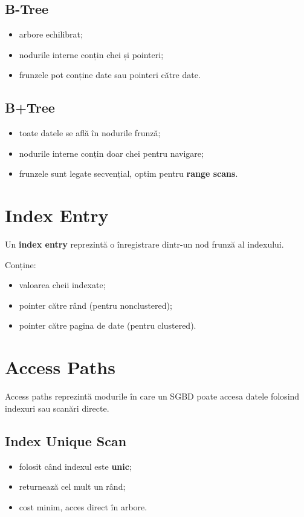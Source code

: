 \documentclass[12pt,a4paper]{article}
\begin{document}
\subsection*{B-Tree}
\begin{itemize}[noitemsep]
    \item arbore echilibrat;
    \item nodurile interne conțin chei și pointeri;
    \item frunzele pot conține date sau pointeri către date.
\end{itemize}

\subsection*{B+Tree}
\begin{itemize}[noitemsep]
    \item toate datele se află în nodurile frunză;
    \item nodurile interne conțin doar chei pentru navigare;
    \item frunzele sunt legate secvențial, optim pentru \textbf{range scans}.
\end{itemize}

\section{Index Entry}
Un \textbf{index entry} reprezintă o înregistrare dintr-un nod frunză al indexului.

Conține:
\begin{itemize}[noitemsep]
    \item valoarea cheii indexate;
    \item pointer către rând (pentru nonclustered);
    \item pointer către pagina de date (pentru clustered).
\end{itemize}

\section{Access Paths}
Access paths reprezintă modurile în care un SGBD poate accesa datele folosind 
indexuri sau scanări directe.

\subsection*{Index Unique Scan}
\begin{itemize}[noitemsep]
    \item folosit când indexul este \textbf{unic};
    \item returnează cel mult un rând;
    \item cost minim, acces direct în arbore.
\end{itemize}
\end{document}
